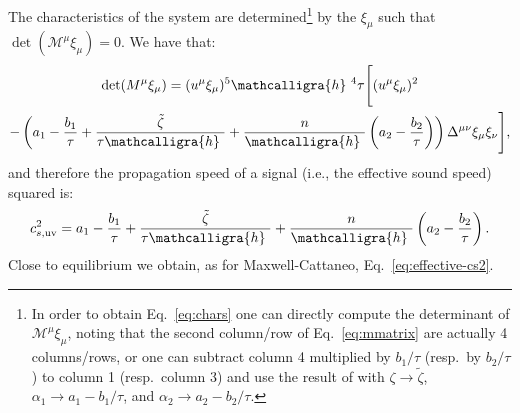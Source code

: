 \documentclass[aps,prd,twocolumn,a4paper,floatfix,nofootbib,superscriptaddress,nofootinbib]{revtex4}
\newcommand{\hden}{\mathcalligra{h}\,\,}
\begin{document}
%
The characteristics of the system are determined\footnote{In order to obtain
Eq.~\eqref{eq:chars} one can directly compute the determinant of $\mathcal
M^\mu\xi_\mu$, noting that the second column/row of Eq.~\eqref{eq:mmatrix} are
actually 4 columns/rows, or one can subtract column 4 multiplied by $b_1/\tau$
(resp.~by $b_2/\tau$) to column 1 (resp.~column 3) and use the result of
\citet{Bemfica19} with $\zeta\to\tilde\zeta$, $\alpha_1\to a_1 - b_1/\tau$, and
$\alpha_2\to a_2 - b_2/\tau$.} by the $\xi_\mu$ such that $\det(\mathcal
M^\mu\xi_\mu)=0$. We have that:
%
\begin{multline}
\label{eq:chars}
\det(M^\mu\xi_\mu)=(u^\mu\xi_\mu)^5\hden^4\tau\Bigg[(u^\mu\xi_\mu)^2\\
- \left( a_1 - \frac{b_1}{\tau} + \frac{\tilde\zeta}{\tau\hden} +
  \frac{n}{\hden}\left(a_2-\frac{b_2}{\tau}\right)
  \right)\Delta^{\mu\nu}\xi_\mu\xi_\nu\Bigg],
\end{multline}
%
and therefore the propagation speed of a signal (i.e., the effective sound speed) squared is:
%
\begin{equation}
\label{eq:hl-propagation-speed}
c_{s,\mathrm{uv}}^2=a_1 - \frac{b_1}{\tau} + \frac{\tilde\zeta}{\tau\hden} +
\frac{n}{\hden}\left(a_2-\frac{b_2}{\tau}\right).
\end{equation}
%
Close to equilibrium we obtain, as for Maxwell-Cattaneo, Eq.~\eqref{eq:effective-cs2}.
\end{document}
